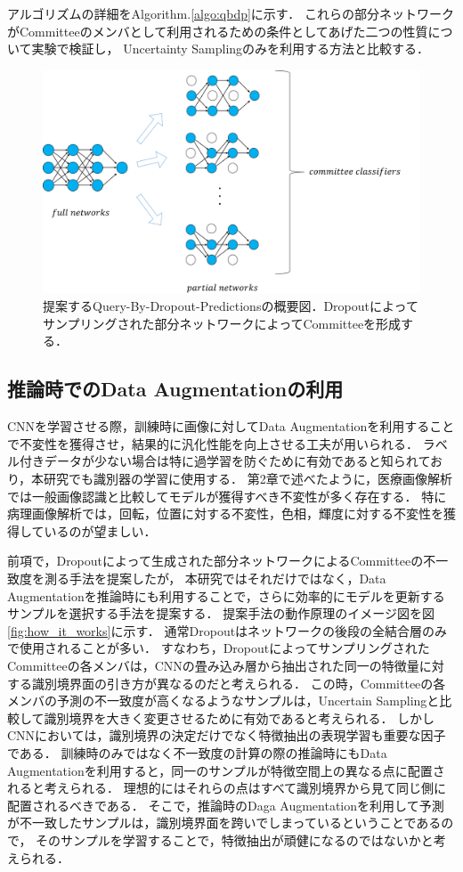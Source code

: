 アルゴリズムの詳細をAlgorithm.\ref{algo:qbdp}に示す．
これらの部分ネットワークがCommitteeのメンバとして利用されるための条件としてあげた二つの性質について実験で検証し，
Uncertainty Samplingのみを利用する方法と比較する．

\begin{figure}[tbp]
     \begin{center}
      \includegraphics[width=120mm]{figures/query_by_dropout.png}
     \end{center}
    \caption{\label{fig:query_by_dropout}提案するQuery-By-Dropout-Predictionsの概要図．Dropoutによってサンプリングされた部分ネットワークによってCommitteeを形成する．}
\end{figure}

\subsection{推論時での\textbf{Data Augmentation}の利用}
CNNを学習させる際，訓練時に画像に対してData Augmentationを利用することで不変性を獲得させ，結果的に汎化性能を向上させる工夫が用いられる．
ラベル付きデータが少ない場合は特に過学習を防ぐために有効であると知られており，本研究でも識別器の学習に使用する．
第2章で述べたように，医療画像解析では一般画像認識と比較してモデルが獲得すべき不変性が多く存在する．
特に病理画像解析では，回転，位置に対する不変性，色相，輝度に対する不変性を獲得しているのが望ましい．

前項で，Dropoutによって生成された部分ネットワークによるCommitteeの不一致度を測る手法を提案したが，
本研究ではそれだけではなく，Data Augmentationを推論時にも利用することで，さらに効率的にモデルを更新するサンプルを選択する手法を提案する．
提案手法の動作原理のイメージ図を図\ref{fig:how_it_works}に示す．
通常Dropoutはネットワークの後段の全結合層のみで使用されることが多い．
すなわち，DropoutによってサンプリングされたCommitteeの各メンバは，CNNの畳み込み層から抽出された同一の特徴量に対する識別境界面の引き方が異なるのだと考えられる．
この時，Committeeの各メンバの予測の不一致度が高くなるようなサンプルは，Uncertain Samplingと比較して識別境界を大きく変更させるために有効であると考えられる．
しかしCNNにおいては，識別境界の決定だけでなく特徴抽出の表現学習も重要な因子である．
訓練時のみではなく不一致度の計算の際の推論時にもData Augmentationを利用すると，同一のサンプルが特徴空間上の異なる点に配置されると考えられる．
理想的にはそれらの点はすべて識別境界から見て同じ側に配置されるべきである．
そこで，推論時のDaga Augmentationを利用して予測が不一致したサンプルは，識別境界面を跨いでしまっているということであるので，
そのサンプルを学習することで，特徴抽出が頑健になるのではないかと考えられる．

